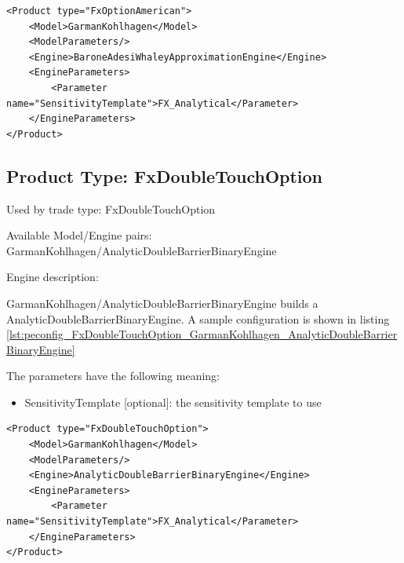 \begin{longlisting}
\begin{verbatim}
<Product type="FxOptionAmerican">
    <Model>GarmanKohlhagen</Model>
    <ModelParameters/>
    <Engine>BaroneAdesiWhaleyApproximationEngine</Engine>
    <EngineParameters>
        <Parameter name="SensitivityTemplate">FX_Analytical</Parameter>
    </EngineParameters>
</Product>
\end{verbatim}
\caption{Configuration for Product FxOptionAmerican, Model GarmanKohlhagen, Engine BaroneAdesiWhaleyApproximationEngine}
\label{lst:peconfig_FxOptionAmerican_GarmanKohlhagen_BaroneAdesiWhaleyApproximationEngine}
\end{longlisting}

\subsection{Product Type: FxDoubleTouchOption}

Used by trade type: FxDoubleTouchOption

Available Model/Engine pairs: GarmanKohlhagen/AnalyticDoubleBarrierBinaryEngine

Engine description:

GarmanKohlhagen/AnalyticDoubleBarrierBinaryEngine builds a AnalyticDoubleBarrierBinaryEngine. A sample configuration is
shown in listing \ref{lst:peconfig_FxDoubleTouchOption_GarmanKohlhagen_AnalyticDoubleBarrierBinaryEngine}

The parameters have the following meaning:

\begin{itemize}
\item SensitivityTemplate [optional]: the sensitivity template to use
\end{itemize}

\begin{longlisting}
\begin{verbatim}
<Product type="FxDoubleTouchOption">
    <Model>GarmanKohlhagen</Model>
    <ModelParameters/>
    <Engine>AnalyticDoubleBarrierBinaryEngine</Engine>
    <EngineParameters>
        <Parameter name="SensitivityTemplate">FX_Analytical</Parameter>
    </EngineParameters>
</Product>
\end{verbatim}
\caption{Configuration for Product FxDoubleTouchOption, Model GarmanKohlhagen, Engine AnalyticDoubleBarrierBinaryEngine}
\label{lst:peconfig_FxDoubleTouchOption_GarmanKohlhagen_AnalyticDoubleBarrierBinaryEngine}
\end{longlisting}

